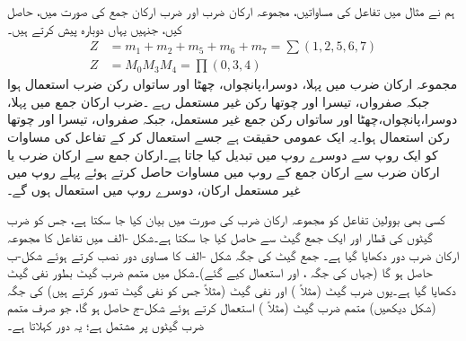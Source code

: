 ہم نے مثال    میں  تفاعل  کی مساواتیں،   مجموعہ ارکان ضرب اور ضرب ارکان جمع کی صورت میں،  حاصل کیں، جنہیں  یہاں دوبارہ پیش کرتے ہیں۔
\begin{align*}
Z&=m_1+m_2+m_5+m_6+m_7=\sum(1,2,5,6,7)\\
Z&=M_0 M_3 M_4=\prod (0,3,4)
\end{align*}
مجموعہ ارکان ضرب میں پہلا، دوسرا،پانچواں، چھٹا اور ساتواں رکن ضرب استعمال ہوا جبکہ  صفرواں، تیسرا اور چوتھا رکن غیر مستعمل رہے ۔ضرب ارکان جمع  میں  پہلا، دوسرا،پانچواں،چھٹا اور ساتواں رکن جمع غیر مستعمل،  جبکہ  صفرواں، تیسرا اور چوتھا رکن   استعمال ہوا۔یہ ایک عمومی  حقیقت  ہے جسے استعمال کر کے  تفاعل کی مساوات کو ایک روپ  سے دوسرے روپ  میں تبدیل کیا جاتا ہے۔ارکان جمع سے ارکان ضرب یا ارکان ضرب سے ارکان جمع کے روپ میں مساوات حاصل کرتے ہوئے پہلے روپ میں  غیر  مستعمل ارکان، دوسرے روپ میں  استعمال ہوں گے۔ 

کسی بھی بوولین تفاعل کو مجموعہ ارکان ضرب کی صورت  میں  بیان کیا جا سکتا ہے، جس  کو ضرب گیٹوں کی قطار اور ایک  جمع گیٹ سے حاصل کیا جا سکتا ہے۔شکل  -الف   میں  تفاعل   کا  مجموعہ ارکان ضرب دور    دکھایا گیا ہے۔ جمع گیٹ  کی جگہ شکل  -الف   کا مساوی دور نصب کرتے ہوئے شکل-ب حاصل ہو گا (جہاں  کی جگہ ،  اور  استعمال کیے گئے)۔شکل    میں  متمم ضرب گیٹ بطور نفی گیٹ  دکھایا گیا ہے۔یوں ضرب گیٹ (مثلاً  ) اور نفی گیٹ (مثلاً  جس کو نفی گیٹ تصور کرتے ہیں)  کی جگہ   (شکل  دیکھیں) متمم ضرب گیٹ (مثلاً )  استعمال کرتے ہوئے شکل-ج  حاصل ہو گا،   جو صرف متمم ضرب گیٹوں پر مشتمل ہے؛  یہ    دور کہلاتا   ہے۔  


